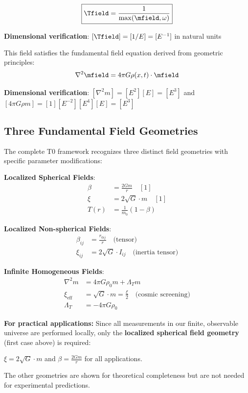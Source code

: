 	\begin{equation}
		\boxed{\Tfield = \frac{1}{\max(\mfield, \omega)}}
		\label{eq:intrinsic_time_field}
	\end{equation}
	
	\textbf{Dimensional verification}: $[\Tfield] = [1/E] = [E^{-1}]$ in natural units \checkmark
	
	This field satisfies the fundamental field equation derived from geometric principles:
	\begin{equation}
		\nabla^2 \mfield = 4\pi G \rho(x,t) \cdot \mfield
		\label{eq:field_equation}
	\end{equation}
	
	\textbf{Dimensional verification}: $[\nabla^2 m] = [E^2][E] = [E^3]$ and $[4\pi G \rho m] = [1][E^{-2}][E^4][E] = [E^3]$ \checkmark
	
	\subsection{Three Fundamental Field Geometries}
	\label{subsec:three_geometries}
	
	The complete T0 framework recognizes three distinct field geometries with specific parameter modifications:
	
	\begin{tcolorbox}[colback=blue!5!white,colframe=blue!75!black,title=T0 Model Parameter Framework]
		\textbf{Localized Spherical Fields}:
		\begin{align}
			\beta &= \frac{2Gm}{r} \quad [1] \\
			\xi &= 2\sqrt{G} \cdot m \quad [1] \\
			T(r) &= \frac{1}{m_0}(1 - \beta)
		\end{align}
		
		\textbf{Localized Non-spherical Fields}:
		\begin{align}
			\beta_{ij} &= \frac{r_{0ij}}{r} \quad \text{(tensor)} \\
			\xi_{ij} &= 2\sqrt{G} \cdot I_{ij} \quad \text{(inertia tensor)}
		\end{align}
		
		\textbf{Infinite Homogeneous Fields}:
		\begin{align}
			\nabla^2 m &= 4\pi G \rho_0 m + \Lambda_T m \\
			\xi_{\text{eff}} &= \sqrt{G} \cdot m = \frac{\xi}{2} \quad \text{(cosmic screening)} \\
			\Lambda_T &= -4\pi G \rho_0
		\end{align}
	\end{tcolorbox}
\begin{tcolorbox}[colback=yellow!5!white,colframe=orange!75!black,title=Practical Simplification Note]
	\textbf{For practical applications:} Since all measurements in our finite, observable universe are performed locally, only the \textbf{localized spherical field geometry} (first case above) is required:
	
	$\xi = 2\sqrt{G} \cdot m$ and $\beta = \frac{2Gm}{r}$ for all applications.
	
	The other geometries are shown for theoretical completeness but are not needed for experimental predictions.
\end{tcolorbox}	
